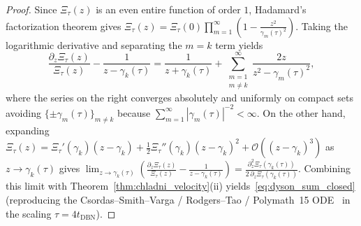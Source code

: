\documentclass[11pt,reqno]{amsart}
\theoremstyle{definition}
\theoremstyle{remark}
\numberwithin{equation}{section}
\begin{document}
\begin{proof}
Since $\Xi_\tau(z)$ is an even entire function of order $1$, Hadamard's factorization theorem gives $\Xi_\tau(z) = \Xi_\tau(0)\prod_{m=1}^\infty (1 - \frac{z^2}{\gamma_m(\tau)^2})$. Taking the logarithmic derivative and separating the $m = k$ term yields
\[
\frac{\partial_z\Xi_\tau(z)}{\Xi_\tau(z)} - \frac{1}{z - \gamma_k(\tau)} = \frac{1}{z + \gamma_k(\tau)} + \sum_{\substack{m=1 \\ m \neq k}}^{\infty} \frac{2z}{z^2 - \gamma_m(\tau)^2},
\]
where the series on the right converges absolutely and uniformly on compact sets avoiding $\{\pm\gamma_m(\tau)\}_{m \neq k}$ because $\sum_{m=1}^\infty |\gamma_m(\tau)|^{-2} < \infty$. On the other hand, expanding $\Xi_\tau(z) = \Xi_\tau'(\gamma_k)(z-\gamma_k) + \frac{1}{2}\Xi_\tau''(\gamma_k)(z-\gamma_k)^2 + \mathcal{O}((z-\gamma_k)^3)$ as $z \to \gamma_k(\tau)$ gives $\lim_{z \to \gamma_k(\tau)} (\frac{\partial_z\Xi_\tau(z)}{\Xi_\tau(z)} - \frac{1}{z-\gamma_k(\tau)}) = \frac{\partial_z^2\Xi_\tau(\gamma_k(\tau))}{2\,\partial_z\Xi_\tau(\gamma_k(\tau))}$. Combining this limit with Theorem~\ref{thm:chladni_velocity}(ii) yields~\eqref{eq:dyson_sum_closed} (reproducing the Csordas--Smith--Varga / Rodgers--Tao / Polymath~15 ODE~\cite{csordas1994,rodgerstao2020,polymath2019} in the scaling $\tau = 4t_{\mathrm{DBN}}$).
\end{proof}
\end{document}
